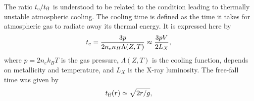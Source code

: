 \documentclass[apjl]{emulateapj}
\begin{document}
The ratio $t_{\rm c}/t_{\rm ff}$ is understood to be related to the condition leading to thermally unstable atmospheric cooling.  
The cooling time is defined as the time it takes for atmospheric gas to radiate away its thermal energy. It is expressed here by
\begin{equation}
t_{\rm c} = \frac{3p}{2n_en_H\Lambda(Z, T)} \approx \frac{3pV}{2L_X},
\end{equation}
where $p = 2 n_e k_B T $ is the gas pressure, $\Lambda(Z, T)$ is the cooling function, depends on metallicity and temperature, and $L_X$ is the X-ray luminosity. The free-fall time was given by
\begin{equation}
t_{\rm ff}(r) \simeq \sqrt{2r/g},
\end{equation}
\end{document}
